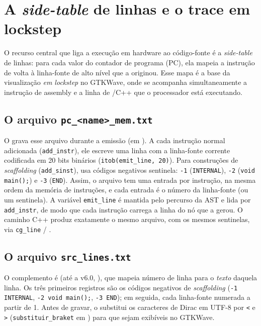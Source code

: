 \section{A \emph{side-table} de linhas e o trace em lockstep}
\label{sec:yanc-sidetable}

O recurso central que liga a execução em hardware ao código-fonte é a
\emph{side-table} de linhas: para cada valor do contador de programa (PC), ela
mapeia a instrução de volta à linha-fonte de alto nível que a originou. Esse mapa
é a base da visualização \emph{em lockstep} no GTKWave, onde se acompanha
simultaneamente a instrução de assembly e a linha de \cmm{}/C++ que o processador
está executando.

\subsection{O arquivo \texttt{pc\_<name>\_mem.txt}}
\label{sec:yanc-sidetable-pc}

O  grava esse arquivo durante a emissão (em ).
A cada instrução normal adicionada (\lstinline|add_instr|), ele escreve uma linha
com a linha-fonte corrente codificada em 20 bits binários
(\lstinline|itob(emit_line, 20)|). Para construções de \emph{scaffolding}
(\lstinline|add_sinst|), usa códigos negativos sentinela: \lstinline|-1|
(\lstinline|INTERNAL|), \lstinline|-2| (\lstinline|void main();|) e \lstinline|-3|
(\lstinline|END|). Assim, o arquivo tem uma entrada por instrução, na mesma ordem
da memória de instruções, e cada entrada é o número da linha-fonte (ou um
sentinela). A variável \lstinline|emit_line| é mantida pelo percurso da AST e lida
por \lstinline|add_instr|, de modo que cada instrução carrega a linha do nó que a
gerou. O caminho C++ produz exatamente o mesmo arquivo, com os mesmos sentinelas,
via \lstinline|cg_line| / .

\subsection{O arquivo \texttt{src\_lines.txt}}
\label{sec:yanc-sidetable-trad}

O complemento é  (até a v6.0, ), que mapeia número de linha para o
\emph{texto} daquela linha. Os três primeiros registros são os códigos negativos
de \emph{scaffolding} (\lstinline|-1 INTERNAL|, \lstinline|-2 void main();|,
\lstinline|-3 END|); em seguida, cada linha-fonte numerada a partir de 1. Antes de
gravar, o  substitui os caracteres de Dirac em UTF-8 por
\lstinline|<| e \lstinline|>| (\lstinline|substituir_braket| em )
para que sejam exibíveis no GTKWave.

